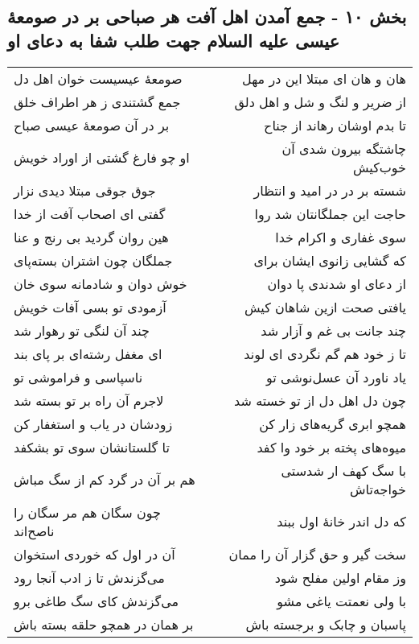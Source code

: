 \begin{center}
\section*{بخش ۱۰ - جمع آمدن اهل آفت هر صباحی بر در صومعهٔ  عیسی علیه السلام جهت طلب شفا به دعای او}
\label{sec:sh010}
\begin{longtable}{l p{0.5cm} r}
صومعهٔ عیسیست خوان اهل دل
&&
هان و هان ای مبتلا این در مهل
\\
جمع گشتندی ز هر اطراف خلق
&&
از ضریر و لنگ و شل و اهل دلق
\\
بر در آن صومعهٔ عیسی صباح
&&
تا بدم اوشان رهاند از جناح
\\
او چو فارغ گشتی از اوراد خویش
&&
چاشتگه بیرون شدی آن خوب‌کیش
\\
جوق جوقی مبتلا دیدی نزار
&&
شسته بر در در امید و انتظار
\\
گفتی ای اصحاب آفت از خدا
&&
حاجت این جملگانتان شد روا
\\
هین روان گردید بی رنج و عنا
&&
سوی غفاری و اکرام خدا
\\
جملگان چون اشتران بسته‌پای
&&
که گشایی زانوی ایشان برای
\\
خوش دوان و شادمانه سوی خان
&&
از دعای او شدندی پا دوان
\\
آزمودی تو بسی آفات خویش
&&
یافتی صحت ازین شاهان کیش
\\
چند آن لنگی تو رهوار شد
&&
چند جانت بی غم و آزار شد
\\
ای مغفل رشته‌ای بر پای بند
&&
تا ز خود هم گم نگردی ای لوند
\\
ناسپاسی و فراموشی تو
&&
یاد ناورد آن عسل‌نوشی تو
\\
لاجرم آن راه بر تو بسته شد
&&
چون دل اهل دل از تو خسته شد
\\
زودشان در یاب و استغفار کن
&&
همچو ابری گریه‌های زار کن
\\
تا گلستانشان سوی تو بشکفد
&&
میوه‌های پخته بر خود وا کفد
\\
هم بر آن در گرد کم از سگ مباش
&&
با سگ کهف ار شدستی خواجه‌تاش
\\
چون سگان هم مر سگان را ناصح‌اند
&&
که دل اندر خانهٔ اول ببند
\\
آن در اول که خوردی استخوان
&&
سخت گیر و حق گزار آن را ممان
\\
می‌گزندش تا ز ادب آنجا رود
&&
وز مقام اولین مفلح شود
\\
می‌گزندش کای سگ طاغی برو
&&
با ولی نعمتت یاغی مشو
\\
بر همان در همچو حلقه بسته باش
&&
پاسبان و چابک و برجسته باش
\\

\end{longtable}
\end{center}
